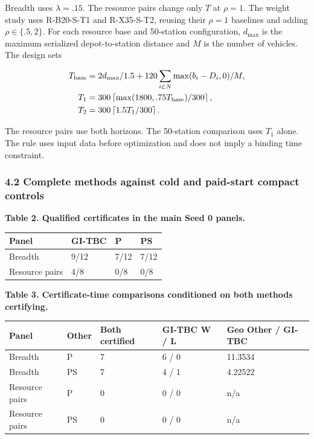 \documentclass[
  american,
  11pt,
]{article}
\newcounter{none} %
\begin{document}
Breadth uses \(\lambda=.15\). The resource pairs change only \(T\) at
\(\rho=1\). The weight study uses R-B20-S-T1 and R-X35-S-T2, reusing
their \(\rho=1\) baselines and adding \(\rho\in\{.5,2\}\). For each
resource base and 50-station configuration, \(d_{\max}\) is the maximum
serialized depot-to-station distance and \(M\) is the number of
vehicles. The design sets

\[
\begin{aligned}
T_{\rm base}&=2d_{\max}/1.5+120\sum_{i\in N}\max(b_i-D_i,0)/M,\\
T_1&=300\left\lceil\max(1800,.75T_{\rm base})/300\right\rceil,\\
T_2&=300\left\lceil1.5T_1/300\right\rceil.
\end{aligned}
\]

The resource pairs use both horizons. The 50-station comparison uses
\(T_1\) alone. The rule uses input data before optimization and does not
imply a binding time constraint.


\subsubsection{4.2 Complete methods against cold and paid-start compact
controls}\label{complete-methods-against-cold-and-paid-start-compact-controls}


\textbf{Table 2. Qualified certificates in the main Seed 0 panels.}

{\def\LTcaptype{none} %
\begin{longtable}[]{@{}llll@{}}
\toprule\noalign{}
Panel & GI-TBC & P & PS \\
\midrule\noalign{}
\endhead
\bottomrule\noalign{}
\endlastfoot
Breadth & 9/12 & 7/12 & 7/12 \\
Resource pairs & 4/8 & 0/8 & 0/8 \\
\end{longtable}
}


\textbf{Table 3. Certificate-time comparisons conditioned on both
methods certifying.}

{\def\LTcaptype{none} %
\begin{longtable}[]{@{}lllll@{}}
\toprule\noalign{}
Panel & Other & Both certified & GI-TBC W / L & Geo Other / GI-TBC \\
\midrule\noalign{}
\endhead
\bottomrule\noalign{}
\endlastfoot
Breadth & P & 7 & 6 / 0 & 11.3534 \\
Breadth & PS & 7 & 4 / 1 & 4.22522 \\
Resource pairs & P & 0 & 0 / 0 & n/a \\
Resource pairs & PS & 0 & 0 / 0 & n/a \\
\end{longtable}
}
\end{document}
